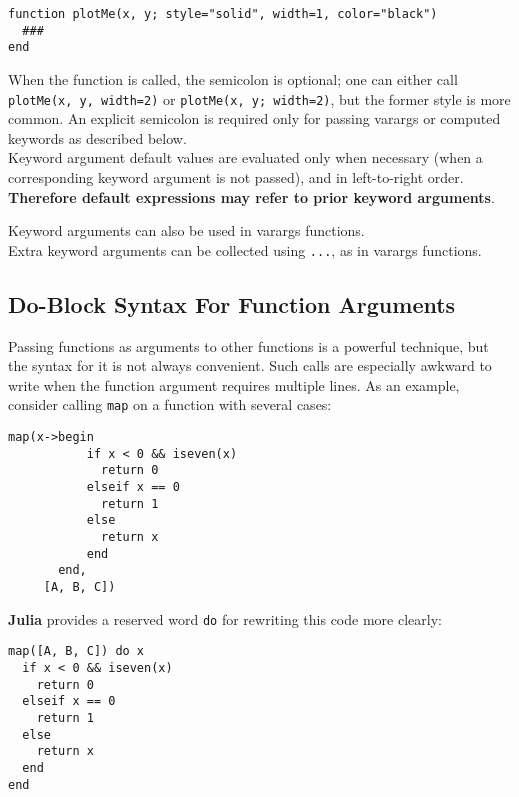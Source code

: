 \documentclass[
]{article}
\begin{document}
\begin{verbatim}
function plotMe(x, y; style="solid", width=1, color="black")
  ###
end
\end{verbatim}

When the function is called, the semicolon is optional; one can either
call \texttt{plotMe(x,\ y,\ width=2)} or
\texttt{plotMe(x,\ y;\ width=2)}, but the former style is more common.
An explicit semicolon is required only for passing varargs or computed
keywords as described below.\\
Keyword argument default values are evaluated only when necessary (when
a corresponding keyword argument is not passed), and in left-to-right
order. \textbf{Therefore default expressions may refer to prior keyword
arguments}.

Keyword arguments can also be used in varargs functions.\\
Extra keyword arguments can be collected using \texttt{...}, as in
varargs functions.

\hypertarget{do-block-syntax-for-function-arguments}{%
\subsection{Do-Block Syntax For Function
Arguments}\label{do-block-syntax-for-function-arguments}}

Passing functions as arguments to other functions is a powerful
technique, but the syntax for it is not always convenient. Such calls
are especially awkward to write when the function argument requires
multiple lines. As an example, consider calling \texttt{map} on a
function with several cases:

\begin{verbatim}
map(x->begin
           if x < 0 && iseven(x)
             return 0
           elseif x == 0
             return 1
           else
             return x
           end
       end,
     [A, B, C])
\end{verbatim}

\textbf{Julia} provides a reserved word \texttt{do} for rewriting this
code more clearly:

\begin{verbatim}
map([A, B, C]) do x
  if x < 0 && iseven(x)
    return 0
  elseif x == 0
    return 1
  else
    return x
  end
end
\end{verbatim}
\end{document}
